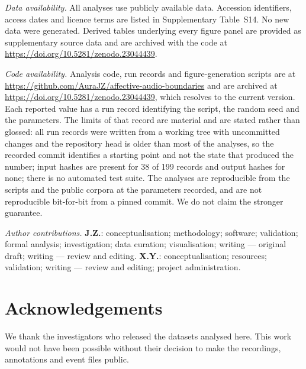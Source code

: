 \emph{Data availability.} All analyses use publicly available data. Accession
identifiers, access dates and licence terms are listed in Supplementary
Table~S14. No new data were generated. Derived tables underlying every figure
panel are provided as supplementary source data and are archived with the code
at \url{https://doi.org/10.5281/zenodo.23044439}.

\emph{Code availability.} Analysis code, run records and figure-generation
scripts are at \url{https://github.com/AuraJZ/affective-audio-boundaries} and
are archived at \url{https://doi.org/10.5281/zenodo.23044439}, which resolves
to the current version. Each reported value has a run record identifying the
script, the random seed
and the parameters. The limits of that record are material and are stated
rather than glossed: all run records were written from a working tree with
uncommitted changes and the repository head is older than most of the
analyses, so the recorded commit identifies a starting point and not the state
that produced the number; input hashes are present for 38 of 199 records and
output hashes for none; there is no automated test suite. The analyses are
reproducible from the scripts and the public corpora at the parameters
recorded, and are not reproducible bit-for-bit from a pinned commit. We do not
claim the stronger guarantee.

\emph{Author contributions.} \textbf{J.Z.}: conceptualisation; methodology;
software; validation; formal analysis; investigation; data curation;
visualisation; writing --- original draft; writing --- review and editing.
\textbf{X.Y.}: conceptualisation; resources; validation; writing --- review
and editing; project administration.

\section*{Acknowledgements}

We thank the investigators who released the datasets analysed here. This work
would not have been possible without their decision to make the recordings,
annotations and event files public.




